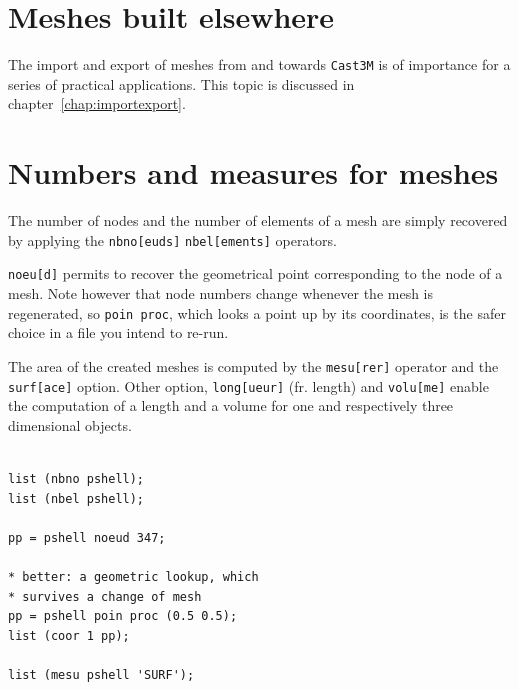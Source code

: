 \section{Meshes built elsewhere}

The import and export of meshes from and towards \texttt{Cast3M} 
is of importance for a series of practical applications. This topic 
is discussed in chapter~\ref{chap:importexport}.

\section{Numbers and measures for meshes}

\begin{castemcom}
The number of nodes and the number of elements of a mesh are simply 
recovered by applying the \texttt{nbno[euds]} \texttt{nbel[ements]}
operators.

\texttt{noeu[d]} permits to recover the geometrical point corresponding to 
the node of a mesh. Note however that node numbers change whenever the mesh
is regenerated, so \texttt{poin proc}, which looks a point up by its
coordinates, is the safer choice in a file you intend to re-run. 

\bigskip 

The area of the created meshes is computed 
by the \texttt{mesu[rer]} operator and the \texttt{surf[ace]} option. Other option,
\texttt{long[ueur]} (fr. length) and \texttt{volu[me]}
enable the computation of a length and a volume for 
one and respectively three dimensional objects.    

 
\end{castemcom}
\begin{castemlines}
\begin{verbatim}

list (nbno pshell);
list (nbel pshell);

pp = pshell noeud 347;

* better: a geometric lookup, which
* survives a change of mesh
pp = pshell poin proc (0.5 0.5);
list (coor 1 pp);

list (mesu pshell 'SURF');


\end{verbatim}
\end{castemlines}

